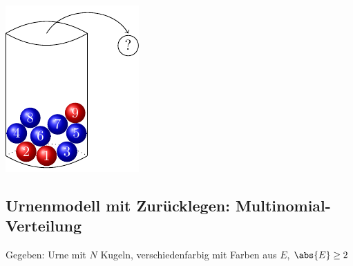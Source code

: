 \begin{center}
%	
    \includegraphics{../../Material/urne_mit_kugeln.pdf}
\end{center}

\subsection{Urnenmodell mit Zurücklegen: Multinomial-Verteilung}

Gegeben: Urne mit $N$ Kugeln, verschiedenfarbig mit Farben aus $E$, $\abs{E} \ge 2$ 

